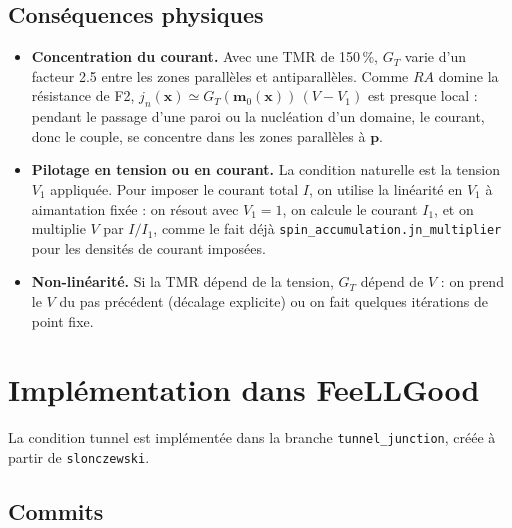 \documentclass[11pt,a4paper]{article}
\newcommand{\vm}{\bm{m}}
\newcommand{\vp}{\bm{p}}
\begin{document}
\subsection{Conséquences physiques}

\begin{itemize}
  \item \textbf{Concentration du courant.} Avec une TMR de 150\,\%, $G_T$
    varie d'un facteur 2.5 entre les zones parallèles et antiparallèles.
    Comme $RA$ domine la résistance de F2, $j_n(\bm{x})\simeq
    G_T(\vm_0(\bm{x}))\,(V-V_1)$ est presque local : pendant le passage
    d'une paroi ou la nucléation d'un domaine, le courant, donc le couple,
    se concentre dans les zones parallèles à $\vp$.
  \item \textbf{Pilotage en tension ou en courant.} La condition naturelle
    est la tension $V_1$ appliquée. Pour imposer le courant total $I$, on
    utilise la linéarité en $V_1$ à aimantation fixée : on résout avec
    $V_1 = 1$, on calcule le courant $I_1$, et on multiplie $V$ par
    $I/I_1$, comme le fait déjà \texttt{spin\_accumulation.jn\_multiplier}
    pour les densités de courant imposées.
  \item \textbf{Non-linéarité.} Si la TMR dépend de la tension, $G_T$
    dépend de $V$ : on prend le $V$ du pas précédent (décalage explicite)
    ou on fait quelques itérations de point fixe.
\end{itemize}

\section{Implémentation dans FeeLLGood}
\label{sec:tunnel-modifs}

La condition tunnel est implémentée dans la branche
\texttt{tunnel\_junction}, créée à partir de \texttt{slonczewski}.

\subsection{Commits}
\end{document}

